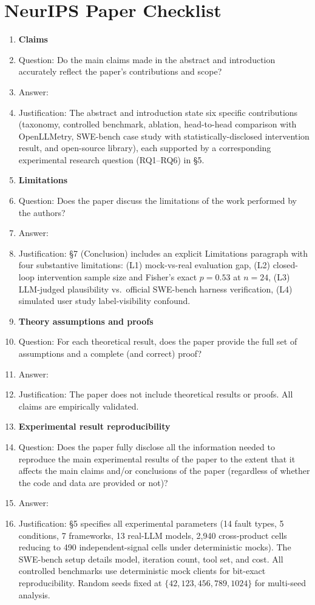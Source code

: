 \section*{NeurIPS Paper Checklist}

\begin{enumerate}

\item {\bf Claims}
    \item[] Question: Do the main claims made in the abstract and introduction accurately reflect the paper's contributions and scope?
    \item[] Answer: \answerYes{}
    \item[] Justification: The abstract and introduction state six specific contributions (taxonomy, controlled benchmark, ablation, head-to-head comparison with OpenLLMetry, SWE-bench case study with statistically-disclosed intervention result, and open-source library), each supported by a corresponding experimental research question (RQ1--RQ6) in \S5.

\item {\bf Limitations}
    \item[] Question: Does the paper discuss the limitations of the work performed by the authors?
    \item[] Answer: \answerYes{}
    \item[] Justification: \S7 (Conclusion) includes an explicit Limitations paragraph with four substantive limitations: (L1) mock-vs-real evaluation gap, (L2) closed-loop intervention sample size and Fisher's exact $p{=}0.53$ at $n{=}24$, (L3) LLM-judged plausibility vs.\ official SWE-bench harness verification, (L4) simulated user study label-visibility confound.

\item {\bf Theory assumptions and proofs}
    \item[] Question: For each theoretical result, does the paper provide the full set of assumptions and a complete (and correct) proof?
    \item[] Answer: \answerNA{}
    \item[] Justification: The paper does not include theoretical results or proofs. All claims are empirically validated.

    \item {\bf Experimental result reproducibility}
    \item[] Question: Does the paper fully disclose all the information needed to reproduce the main experimental results of the paper to the extent that it affects the main claims and/or conclusions of the paper (regardless of whether the code and data are provided or not)?
    \item[] Answer: \answerYes{}
    \item[] Justification: \S5 specifies all experimental parameters (14 fault types, 5 conditions, 7 frameworks, 13 real-LLM models, 2{,}940 cross-product cells reducing to 490 independent-signal cells under deterministic mocks). The SWE-bench setup details model, iteration count, tool set, and cost. All controlled benchmarks use deterministic mock clients for bit-exact reproducibility. Random seeds fixed at $\{42, 123, 456, 789, 1024\}$ for multi-seed analysis.


\end{enumerate}
